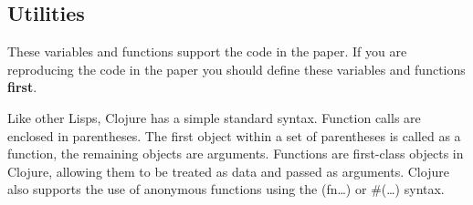 \documentclass[11pt]{article}
\begin{document}
\subsection{Utilities}
\label{sec:org95e66fb}
These variables and functions support the code in the paper. If you are reproducing the code in the paper you should define these variables and functions \textbf{first}.

Like other Lisps, Clojure has a simple standard syntax. Function calls are enclosed in parentheses. The first object within a set of parentheses is called as a function, the remaining objects are arguments. Functions are first-class objects in Clojure, allowing them to be treated as data and passed as arguments. Clojure also supports the use of anonymous functions using the (fn\ldots{}) or \#(\ldots{}) syntax.
\end{document}
